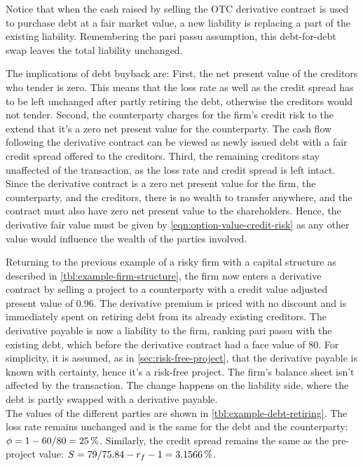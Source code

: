 \documentclass[../main.tex]{subfiles}
\begin{document}
            Notice that when the cash raised by selling the OTC derivative contract 
            is used to purchase debt at a fair market value, a new liability is replacing a part of the existing liability. 
            Remembering the pari passu assumption, this debt-for-debt swap leaves the total liability unchanged.

            The implications of debt buyback are: 
            First, the net present value of the creditors who tender is zero. 
            This means that the loss rate as well as the credit spread has to be left unchanged
            after partly retiring the debt, otherwise the creditors would not tender. 
            Second, the counterparty charges for the firm's credit risk 
            to the extend that it's a zero net present value for the counterparty. 
            The cash flow following the derivative contract can be viewed as newly issued debt
            with a fair credit spread offered to the creditors.
            Third, the remaining creditors stay unaffected of the transaction, 
            as the loss rate and credit spread is left intact. 
            Since the derivative contract is a zero net present value for the firm, 
            the counterparty, and the creditors, there is no wealth to transfer anywhere,
            and the contract must also have zero net present value to the shareholders. 
            Hence, the derivative fair value must be given by \cref{eqn:option-value-credit-risk} 
            as any other value would influence the wealth of the parties involved.

            Returning to the previous example of a risky firm with a capital structure
            as described in \cref{tbl:example-firm-structure}, 
            the firm now enters a derivative contract by selling a project to a counterparty
            with a credit value adjusted present value of \num{0.96}. 
            The derivative premium is priced with no discount 
            and is immediately spent on retiring debt from its already existing creditors. 
            The derivative payable is now a liability to the firm, ranking pari passu with the existing debt, 
            which before the derivative contract had a face value of 80. 
            For simplicity, it is assumed, as in \cref{sec:risk-free-project},
            that the derivative payable is known with certainty, hence it's a risk-free project. 
            The firm's balance sheet isn't affected by the transaction. 
            The change happens on the liability side, where the debt is partly swapped with a derivative payable.\\
            The values of the different parties are shown in \cref{tbl:example-debt-retiring}. 
            The loss rate remains unchanged and is the same for the debt and the counterparty: $\phi=1-\num{60}/\num{80}=\pct{0.25}$. 
            Similarly, the credit spread remains the same as the pre-project value: $S=\num{79}/\num{75.84}-r_{f}-1=\pct{0.031566}$.
            
\end{document}
